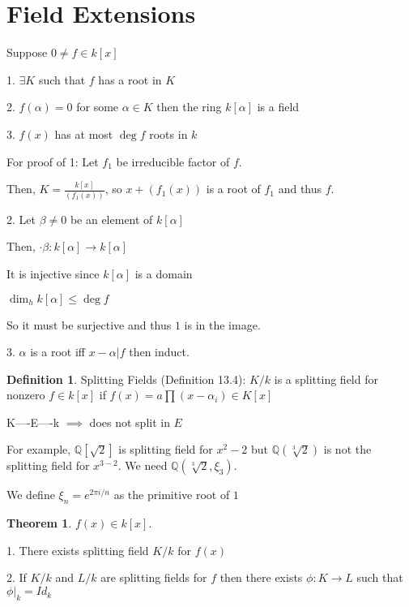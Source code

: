 \documentclass{article}
\theoremstyle{definition}
\newtheorem{definition}{Definition}
\newtheorem{theorem}{Theorem}
\begin{document}
\section*{Field Extensions}

Suppose \(0 \neq f \in k[x]\)

1. \(\exists K\) such that \(f\) has a root in \(K\) 

2. \(f(\alpha )=0\) for some \(\alpha \in K\)  then the ring \(k[\alpha ]\) is a field

3. \(f(x)\) has at most \(\deg f\) roots in \(k\) 

For proof of 1: Let \(f_1\) be irreducible factor of \(f\).

Then, \(K=\frac{k[x]}{(f_1(x))}\), so \(x+(f_1(x))\) is a root of \(f_1\) and thus \(f\).

2. Let \(\beta \neq 0\) be an element of \(k[\alpha]\) 

Then, \(\cdot \beta : k[\alpha] \to k[\alpha]\) 

It is injective since \(k[\alpha]\) is a domain

\(\dim_h k[\alpha ]\leq \deg f\) 

So it must be surjective and thus \(1\) is in the image.

3. \(\alpha \) is a root iff \(x-\alpha | f\)  then induct.

\begin{definition}
    Splitting Fields (Definition 13.4): \(K/k\) is a splitting field for nonzero \(f\in k[x]\) if \(f(x) = a \prod (x-\alpha _i)\in K[x]\)
    
    K----E----k \(\implies \) does not split in \(E\)
    
    For example, \(\mathbb{Q} [\sqrt{2} ]\) is splitting field for \(x^2-2\) but \(\mathbb{Q} (\sqrt[3]{2} )\) is not the splitting field for \(x^{3-2} \). We need \(\mathbb{Q} (\sqrt[3]{2},\xi _3 )\).

\end{definition}

We define \(\xi _n=e^{2\pi i/n} \) as the primitive root of \(1\)

\begin{theorem}
    \(f(x)\in k[x]\).

    1. There exists splitting field \(K/k\) for \(f(x)\)
    
    2. If \(K/k\) and \(L/k\) are splitting fields for \(f\) then there exists \(\phi : K \to L\) such that \(\phi |_{k}=Id_k \) 

\end{theorem}
\end{document}
